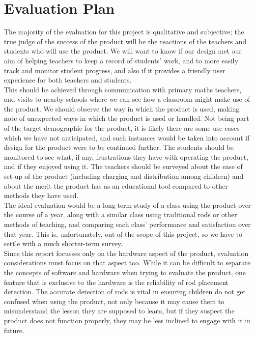 \chapter{Evaluation Plan}

The majority of the evaluation for this project is qualitative and subjective; the true judge of the success of the product will be the reactions of the teachers and students who will use the product. We will want to know if our design met our aim of helping teachers to keep a record of students' work, and to more easily track and monitor student progress, and also if it provides a friendly user experience for both teachers and students. \\

This should be achieved through communication with primary maths teachers, and visits to nearby schools where we can see how a classroom might make use of the product. We should observe the way in which the product is used, making note of unexpected ways in which the product is used or handled. Not being part of the target demographic for the product, it is likely there are some use-cases which we have not anticipated, and such instances would be taken into account if design for the product were to be continued further. The students should be monitored to see what, if any, frustrations they have with operating the product, and if they enjoyed using it. The teachers should be surveyed about the ease of set-up of the product (including charging and distribution among children) and about the merit the product has as an educational tool compared to other methods they have used. \\

The ideal evaluation would be a long-term study of a class using the product over the course of a year, along with a similar class using traditional rods or other methods of teaching, and comparing each class' performance and satisfaction over that year. This is, unfortunately, out of the scope of this project, so we have to settle with a much shorter-term survey. \\

Since this report focusses only on the hardware aspect of the product, evaluation considerations must focus on that aspect too. While it can be difficult to separate the concepts of software and hardware when trying to evaluate the product, one feature that is exclusive to the hardware is the reliability of rod placement detection. The accurate detection of rods is vital in ensuring children do not get confused when using the product, not only because it may cause them to misunderstand the lesson they are supposed to learn, but if they suspect the product does not function properly, they may be less inclined to engage with it in future. \\

